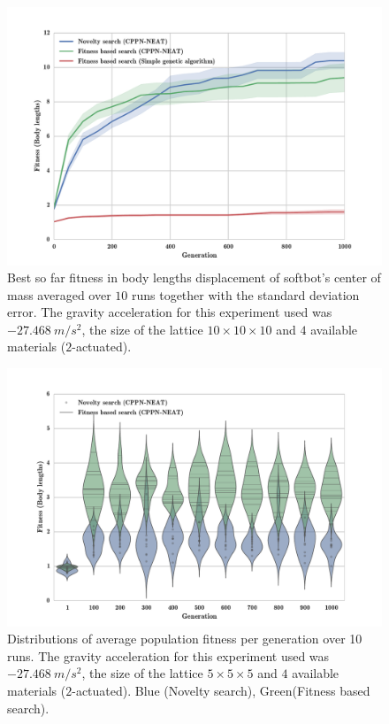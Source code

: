 \begin{figure}[h!]
\centering
\includegraphics[width=1.0\textwidth]{../Figures/Results/FitvsNovVsDirSize10.pdf}
\caption{Best so far fitness in body lengths displacement of softbot's center of mass averaged over $10$ runs together with the standard deviation error. The gravity acceleration for this experiment used was $-27.468\   m/s^2$, the size of the lattice $10\times 10\times10$ and $4$ available materials ($2$-actuated).}
\label{fig:FitvsNovVsDirSize10}
\end{figure}

\begin{figure}
\centering
\includegraphics[width=1.0\textwidth]{../Figures/Results/ViolinPlotsAvgGenFitSize5.pdf}
\caption{Distributions of average population fitness per generation over 10 runs. The gravity acceleration for this experiment used was $-27.468\   m/s^2$, the size of the lattice $5\times 5\times5$ and $4$ available materials ($2$-actuated). Blue (Novelty search), Green(Fitness based search).}
\label{fig:ViolinPlotsAvgGenFitSize5}
\end{figure}


